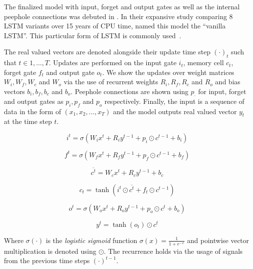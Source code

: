 The finalized model with input, forget and output gates as well as the internal peephole connections was debuted in \textcite{graves_framewise_2005}.
In their expansive study comparing 8 LSTM variants over 15 years of CPU time, \textcite{greff_lstm_2017} named this model the \enquote{vanilla LSTM}.
This particular form of LSTM is commonly used~\cite{sutskever_sequence_2014}.

The real valued vectors are denoted alongside their update time step ${(\cdot)}_t$ such that $t \in {1, \dots, T}$.
Updates are performed on the input gate $i_t$, memory cell $c_t$, forget gate $f_t$ and output gate $o_t$.
We show the updates over weight matrices $W_i, W_f, W_c$ and $W_o$ via the use of recurrent weights $R_i, R_f, R_c$ and $R_o$ and bias vectors $b_i, b_f, b_c$ and $b_o$.
Peephole connections are shown using $p_{\cdot}$ for input, forget and output gates as $p_{i}, p_{f}$ and $p_{o}$ respectively.
Finally, the input is a sequence of data in the form of $(x_1, x_2, \dots, x_T)$ and the model outputs real valued vector $y_{t}$ at the time step $t$.

\begin{equation}
    i^{t} = \sigma\left(W_{i}x^{t} + R_{i}y^{t-1} + p_{i} \odot c^{t-1} + b_{i}\right)
\end{equation}

\begin{equation}
    f^{t} = \sigma\left(W_{f}x^{t} + R_{f}y^{t-1} + p_{f} \odot c^{t-1} + b_{f}\right)
\end{equation}

\begin{equation}
    \overbar{c^{t}} = W_{c}x^{t} + R_{c}y^{t-1} + b_{c}
\end{equation}

\begin{equation}
    c_{t} = \tanh\left(i^{t} \odot \overbar{c^{t}} + f_{t} \odot c^{t-1}\right)
\end{equation}

\begin{equation}
    o^{t} = \sigma\left(W_{o}x^{t} + R_{o}y^{t-1} + p_{o} \odot c^{t} + b_{o}\right)
\end{equation}

\begin{equation}
    y^{t} = \tanh(o_{t}) \odot c^{t}
\end{equation}

Where $\sigma(\cdot)$ is the \emph{logistic sigmoid} function $\sigma(x) = \frac{1}{1 + e^{-x}}$ and pointwise vector multiplication is denoted using $\odot$.
The recurrence holds via the usage of signals from the previous time steps $(\cdot)^{t-1}$.

